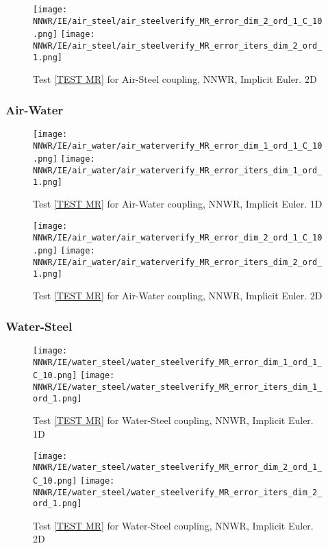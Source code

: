 \documentclass[a4paper,10pt]{article}
\begin{document}
\begin{figure}[!ht]
\texttt{[image: NNWR/IE/air\_steel/air\_steelverify\_MR\_error\_dim\_2\_ord\_1\_C\_10.png]}
\texttt{[image: NNWR/IE/air\_steel/air\_steelverify\_MR\_error\_iters\_dim\_2\_ord\_1.png]}
\caption{Test \ref{TEST MR} for Air-Steel coupling, NNWR, Implicit Euler. 2D}
\label{FIG NNWR IE AIR STEEL 2D}
\end{figure}

\FloatBarrier
\subsubsection{Air-Water}\label{SEC NNWR IE AIR WATER}
% 

\begin{figure}[!ht]
\texttt{[image: NNWR/IE/air\_water/air\_waterverify\_MR\_error\_dim\_1\_ord\_1\_C\_10.png]}
\texttt{[image: NNWR/IE/air\_water/air\_waterverify\_MR\_error\_iters\_dim\_1\_ord\_1.png]}
\caption{Test \ref{TEST MR} for Air-Water coupling, NNWR, Implicit Euler. 1D}
\label{FIG NNWR IE AIR WATER 1D}
\end{figure}

\begin{figure}[!ht]
\texttt{[image: NNWR/IE/air\_water/air\_waterverify\_MR\_error\_dim\_2\_ord\_1\_C\_10.png]}
\texttt{[image: NNWR/IE/air\_water/air\_waterverify\_MR\_error\_iters\_dim\_2\_ord\_1.png]}
\caption{Test \ref{TEST MR} for Air-Water coupling, NNWR, Implicit Euler. 2D}
\label{FIG NNWR IE AIR WATER 2D}
\end{figure}

\FloatBarrier
\subsubsection{Water-Steel}\label{SEC NNWR IE WATER STEEL}
% 

\begin{figure}[!ht]
\texttt{[image: NNWR/IE/water\_steel/water\_steelverify\_MR\_error\_dim\_1\_ord\_1\_C\_10.png]}
\texttt{[image: NNWR/IE/water\_steel/water\_steelverify\_MR\_error\_iters\_dim\_1\_ord\_1.png]}
\caption{Test \ref{TEST MR} for Water-Steel coupling, NNWR, Implicit Euler. 1D}
\label{FIG NNWR IE WATER STEEL 1D}
\end{figure}

\begin{figure}[!ht]
\texttt{[image: NNWR/IE/water\_steel/water\_steelverify\_MR\_error\_dim\_2\_ord\_1\_C\_10.png]}
\texttt{[image: NNWR/IE/water\_steel/water\_steelverify\_MR\_error\_iters\_dim\_2\_ord\_1.png]}
\caption{Test \ref{TEST MR} for Water-Steel coupling, NNWR, Implicit Euler. 2D}
\label{FIG NNWR IE WATER STEEL 2D}
\end{figure}
\end{document}
